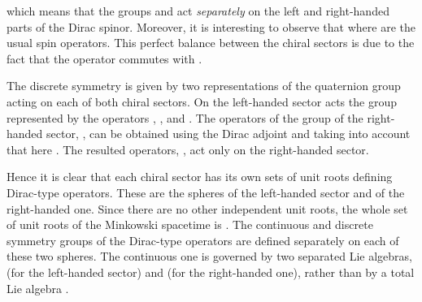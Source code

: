 \documentclass[a4paper,12pt]{article}
\begin{document}
which means that the \coordHE{} groups \coordHE{} and 
\coordHE{} act {\em separately} on the left and right-handed 
parts of the Dirac spinor. Moreover, it is interesting to observe that 
\coordHE{}  where 
\coordHE{} are the usual spin operators.
This perfect balance between the chiral sectors is due to the fact that 
the operator \coordHE{} commutes with \coordHE{}. 


The discrete symmetry is given by two representations of the quaternion group 
acting on each of both chiral sectors. On the left-handed sector acts the 
group  \coordHE{} represented by the operators \coordHE{}, 
\coordHE{}, 
\coordHE{} and  \coordHE{}. The operators 
of the group of the right-handed sector, \coordHE{}, can be 
obtained using the Dirac adjoint and taking into account that here 
\coordHE{}. The resulted operators, 
\coordHE{}, 
act only on the right-handed sector. 

Hence it is clear that each chiral sector has its own sets of unit roots 
defining Dirac-type operators. These are  the spheres \coordHE{} of the 
left-handed sector and \coordHE{} of the right-handed one. Since there are 
no other independent unit roots, the whole set of unit roots  of the Minkowski 
spacetime is \coordHE{}. The continuous 
and discrete symmetry groups of the Dirac-type operators are defined separately 
on each of these two spheres. The continuous one is governed by two separated 
Lie algebras, \coordHE{} (for the left-handed sector) and 
\coordHE{} (for the right-handed one), rather than by a total Lie 
algebra \coordHE{} \cite{K2}. 
 
\end{document}
